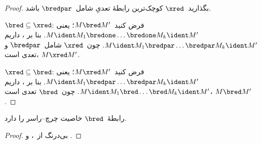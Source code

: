 \documentclass[../../../include/open-logic-section]{subfiles}
\begin{document}
\begin{proof}
  بگذارید~$\xred$ کوچک‌ترین رابطهٔ تعدیِ شامل~$\bredpar$ باشد.

  $\bred \subseteq \xred$: فرض کنید~$M \bred M'$؛ یعنی
  $M \ident M_1 \bredone \dots \bredone M_k \ident M'$. بنا بر
  ، داریم
  $M \ident M_1 \bredpar \dots \bredpar M_k \ident M'$. چون~$\xred$
  شامل~$\bredpar$ و تعدی است، $M \xred M'$.

  $\xred \subseteq \bred$: فرض کنید~$M \xred M'$؛ یعنی
  $M \ident M_1 \bredpar \dots \bredpar M_k \ident M'$. بنا بر
  ، داریم
  $M \ident M_1 \bred \dots \bred M_k \ident M'$. چون~$\bred$ تعدی
  است، $M \bred M'$.
\end{proof}

\begin{thm}
  رابطهٔ~$\bred$ خاصیت چرچ--راسر را دارد.
\end{thm}

\begin{proof}
  بی‌درنگ از~،  و
  .
\end{proof}
\end{document}
